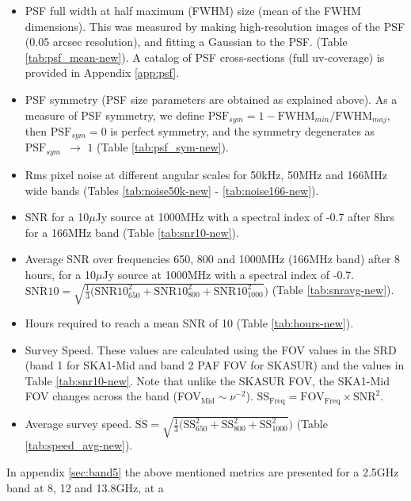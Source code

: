 \documentclass[sfheadings,a4paper,times,9pt,floats,floatfix]{article}
\begin{document}
\begin{itemize}
 \item PSF full width at half maximum (FWHM) size (mean of the FWHM dimensions). This was measured by making high-resolution
images of the PSF (0.05 arcsec resolution), and fitting a Gaussian to the PSF. (Table \ref{tab:psf_mean-new}). A catalog of PSF
cross-sections (full uv-coverage) is provided in Appendix \ref{app:psf}.

 \item PSF symmetry (PSF size parameters are obtained as explained above). As a measure of PSF symmetry, we define 
$\text{PSF}_{sym}=1-\text{FWHM}_{min}/\text{FWHM}_{maj}$, then $\text{PSF}_{sym} = 0$ is perfect symmetry, and the symmetry
degenerates as $\text{PSF}_{sym}\,\,\, \rightarrow\,\,1$ (Table \ref{tab:psf_sym-new}).

 \item Rms pixel noise at different angular scales for 50kHz, 50MHz and 166MHz wide bands (Tables \ref{tab:noise50k-new} -
\ref{tab:noise166-new}).
 
 \item SNR for a 10$\mu$Jy source at 1000MHz with a spectral index of -0.7 after 8hrs for a 166MHz band (Table
\ref{tab:snr10-new}).
 
 \item Average SNR over frequencies 650, 800 and 1000MHz (166MHz band) after 8 hours, for a 10$\mu$Jy source at 1000MHz with a
spectral index of -0.7. {$\overline{\text{SNR10}}=\sqrt{\frac{1}{3}(\text{SNR10}_{650}^2 + \text{SNR10}_{800}^2
+\text{SNR10}_{1000}^2})$} (Table \ref{tab:snravg-new}).

 \item Hours required to reach a mean SNR of 10 (Table \ref{tab:hours-new}).
 
 \item Survey Speed. These values are calculated using the FOV values in the SRD (band 1 for SKA1-Mid and band 2 PAF FOV for
SKASUR) and the values in Table \ref{tab:snr10-new}. Note that unlike the SKASUR FOV, the SKA1-Mid FOV changes across the band
(FOV$_{\text{Mid}}\sim \nu^{-2}$). $\text{SS}_\text{Freq} = \text{FOV}_\text{Freq}\times \text{SNR}^2$. 
 \item Average survey speed. {$\overline{\text{SS}} =\sqrt{\frac{1}{3}(\text{SS}_{650}^2 + \text{SS}_{800}^2
+\text{SS}_{1000}^2})$} (Table \ref{tab:speed_avg-new}).
\end{itemize}
In appendix \ref{sec:band5} the above mentioned metrics are presented for a 2.5GHz band at 8, 12 and 13.8GHz, at a
\end{document}
